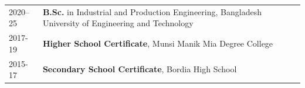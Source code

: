 

\renewcommand{\thefootnote}{\fnsymbol{footnote}}
\setcounter{footnote}{0}

\begin{longtable}[l]{@{}p{} p{}}

    2020--25 & \textbf{B.Sc.} in Industrial and Production Engineering, Bangladesh University of Engineering and Technology \\

    2017-19 & \textbf{Higher School Certificate}, Munsi Manik Mia Degree College \\

    2015-17 & \textbf{Secondary School Certificate}, Bordia High School 
\end{longtable}



\renewcommand{\thefootnote}{\arabic{footnote}}
\setcounter{footnote}{1}

